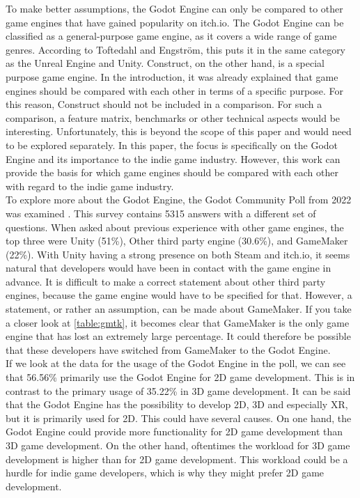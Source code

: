To make better assumptions, the Godot Engine can only be compared to other game engines that have gained popularity on itch.io.
The Godot Engine can be classified as a general-purpose game engine, as it covers a wide range of game genres.
According to Toftedahl and Engström, this puts it in the same category as the Unreal Engine and Unity.
Construct, on the other hand, is a special purpose game engine.
In the introduction, it was already explained that game engines should be compared with each other in terms of a specific purpose.
For this reason, Construct should not be included in a comparison.
For such a comparison, a feature matrix, benchmarks or other technical aspects would be interesting.
Unfortunately, this is beyond the scope of this paper and would need to be explored separately.
In this paper, the focus is specifically on the Godot Engine and its importance to the indie game industry.
However, this work can provide the basis for which game engines should be compared with each other with regard to the indie game industry.\\

To explore more about the Godot Engine, the Godot Community Poll from 2022 was examined \cite{godot-poll-results}.
This survey contains 5315 answers with a different set of questions.
When asked about previous experience with other game engines, the top three were Unity (51\%), Other third party engine (30.6\%), and GameMaker (22\%).
With Unity having a strong presence on both Steam and itch.io, it seems natural that developers would have been in contact with the game engine in advance.
It is difficult to make a correct statement about other third party engines, because the game engine would have to be specified for that.
However, a statement, or rather an assumption, can be made about GameMaker.
If you take a closer look at \autoref{table:gmtk}, it becomes clear that GameMaker is the only game engine that has lost an extremely large percentage.
It could therefore be possible that these developers have switched from GameMaker to the Godot Engine.\\

If we look at the data for the usage of the Godot Engine in the poll, we can see that 56.56\% primarily use the Godot Engine for 2D game development.
This is in contrast to the primary usage of 35.22\% in 3D game development.
It can be said that the Godot Engine has the possibility to develop 2D, 3D and especially XR, but it is primarily used for 2D.
This could have several causes.
On one hand, the Godot Engine could provide more functionality for 2D game development than 3D game development.
On the other hand, oftentimes the workload for 3D game development is higher than for 2D game development.
This workload could be a hurdle for indie game developers, which is why they might prefer 2D game development.\\


